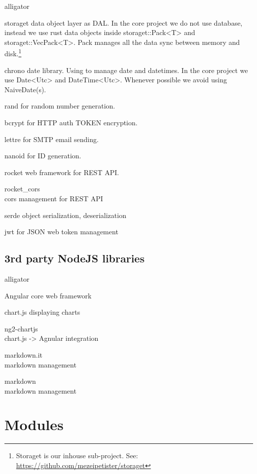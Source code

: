 \documentclass{article}
\begin{document}
\begin{labeling}{alligator}
  \item [storaget] data object layer as DAL. In the core project we do
    not use database, instead we use rust data objects inside
    storaget::Pack<T> and storaget::VecPack<T>. Pack manages all the
    data sync between memory and disk.\footnote{Storaget is our inhouse sub-project. See: \url{https://github.com/mezeipetister/storaget}}
  \item [chrono] date library. Using to manage date and datetimes. In
    the core project we use Date<Utc> and DateTime<Utc>. Whenever possible
    we avoid using NaiveDate(s).
  \item [rand] for random number generation.
  \item [bcrypt] for HTTP auth TOKEN encryption.
  \item [lettre] for SMTP email sending.
  \item [nanoid] for ID generation.
  \item [rocket] web framework for REST API.
  \item [rocket\_cors] \hfill \\ cors management for REST API
  \item [serde] object serialization, deserialization
  \item [jwt] for JSON web token management
\end{labeling}

\subsection{3rd party NodeJS libraries}

\begin{labeling}{alligator}
  \item [Angular] core web framework
  \item [chart.js] displaying charts
  \item [ng2-chartjs] \hfill \\ chart.js -> Agnular integration
  \item [markdown.it] \hfill \\ markdown management
  \item [markdown] \hfill \\ markdown management
\end{labeling}

\newpage

\section{Modules}
\end{document}
